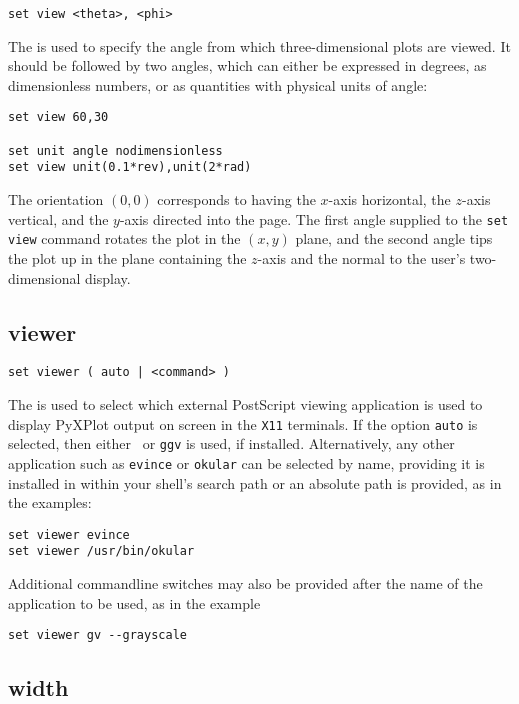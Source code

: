 \begin{verbatim}
set view <theta>, <phi>
\end{verbatim}

The  is used to specify the angle from which
three-dimensional plots are viewed. It should be followed by two angles, which
can either be expressed in degrees, as dimensionless numbers, or as quantities
with physical units of angle:
\begin{verbatim}
set view 60,30

set unit angle nodimensionless
set view unit(0.1*rev),unit(2*rad)
\end{verbatim}
The orientation $(0,0)$ corresponds to having the $x$-axis horizontal, the
$z$-axis vertical, and the $y$-axis directed into the page. The first angle
supplied to the {\tt set view} command rotates the plot in the $(x,y)$ plane,
and the second angle tips the plot up in the plane containing the $z$-axis and
the normal to the user's two-dimensional display.


\subsection{viewer}

\begin{verbatim}
set viewer ( auto | <command> )
\end{verbatim}

The  is used to select which external PostScript viewing
application is used to display PyXPlot output on screen in the {\tt X11}
terminals. If the option {\tt auto} is selected, then either \ghostview\ or
{\tt ggv} is used, if installed. Alternatively, any other application such as
{\tt evince} or {\tt okular} can be selected by name, providing it is installed
in within your shell's search path or an absolute path is provided, as in the
examples:

\begin{verbatim}
set viewer evince
set viewer /usr/bin/okular
\end{verbatim}

\noindent Additional commandline switches may also be provided after the name
of the application to be used, as in the example

\begin{verbatim}
set viewer gv --grayscale
\end{verbatim}


\subsection{width}

